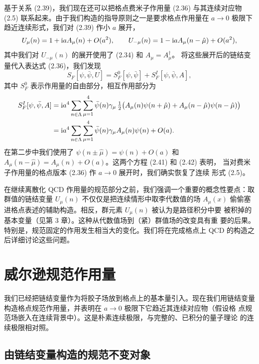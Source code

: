 基于关系 (2.39)，我们现在还可以把格点费米子作用量 (2.36) 与其连续对应物
(2.5) 联系起来。由于我们构造的指导原则之一是要求格点作用量在 $a \to 0$
极限下趋近连续形式，我们对 (2.39) 作小 $a$ 展开，
\begin{equation}
  U_\mu(n) = 1 + \mathrm{i} a A_\mu(n) + O(a^2) , \qquad
  U_{-\mu}(n) = 1 - \mathrm{i} a A_\mu(n - \hat\mu) + O(a^2) ,
\end{equation}
其中我们对 $U_{-\mu}(n)$ 的展开使用了 (2.34) 和 $A_\mu = A_\mu^\dagger$。
将这些展开后的链结变量代入表达式 (2.36)，我们发现
\begin{equation}
  S_F[\psi, \bar\psi, U] = S_F^0[\psi, \bar\psi] + S_F^I[\psi, \bar\psi, A] ,
\end{equation}
其中 $S_F^0$ 表示作用量的自由部分，相互作用部分为
\begin{equation}
  \begin{split}
    S_F^I[\psi, \bar\psi, A] &= \mathrm{i} a^4 \sum_{n\in\Lambda}\sum_{\mu=1}^{4}
      \bar\psi(n) \gamma_\mu\,
      \tfrac{1}{2}\big(A_\mu(n) \psi(n + \hat\mu) + A_\mu(n - \hat\mu)
        \psi(n - \hat\mu)\big) \\
    &= \mathrm{i} a^4 \sum_{n\in\Lambda}\sum_{\mu=1}^{4}
      \bar\psi(n) \gamma_\mu A_\mu(n) \psi(n) + O(a) .
  \end{split}
\end{equation}
在第二步中我们使用了 $\psi(n \pm \hat\mu) = \psi(n) + O(a)$ 和
$A_\mu(n - \hat\mu) = A_\mu(n) + O(a)$。这两个方程 (2.41) 和 (2.42) 表明，
当对费米子作用量的格点版本 (2.36) 作 $a \to 0$ 展开时，我们确实恢复了连续
形式 (2.5)。

在继续离散化 QCD 作用量的规范部分之前，我们强调一个重要的概念性要点：取
群值的链结变量 $U_\mu(n)$ 不仅仅是把连续情形中取李代数值的场 $A_\mu(x)$
偷偷塞进格点表述的辅助构造。相反，群元素 $U_\mu(n)$ 被认为是路径积分中要
被积掉的基本变量（见第 3 章）。这种从代数值场到（紧）群值场的改变具有重
要的后果。特别是，规范固定的作用发生相当大的变化。我们将在完成格点上 QCD
的构造之后详细讨论这些问题。

\section{威尔逊规范作用量}

我们已经把链结变量作为将胶子场放到格点上的基本量引入。现在我们用链结变量
构造格点规范作用量，并表明在 $a \to 0$ 极限下它趋近其连续对应物（假设格
点规范场嵌入在连续背景中）。这是朴素连续极限，与完整的、已积分的量子理论
的连续极限相对照。

\subsection{由链结变量构造的规范不变对象}

